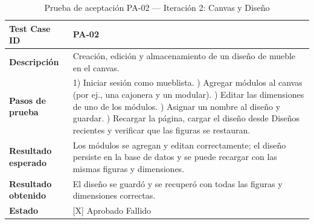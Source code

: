 ﻿\documentclass{iccmemoria}
\begin{document}
\begin{table}[H]
\centering
\caption{Prueba de aceptación PA-02 — Iteración 2: Canvas y Diseño}
\label{tab:pa02}
\begin{tabular}{|p{4cm}|p{9.5cm}|}
\hline
\textbf{Test Case ID} & PA-02 \\
\hline
\textbf{Descripción} & Creación, edición y almacenamiento de un diseño de mueble en el canvas. \\
\hline
\textbf{Pasos de prueba} &
1) Iniciar sesión como mueblista. \newline
2) Agregar módulos al canvas (por ej., una cajonera y un modular). \newline
3) Editar las dimensiones de uno de los módulos. \newline
4) Asignar un nombre al diseño y guardar. \newline
5) Recargar la página, cargar el diseño desde Diseños recientes y verificar que las figuras se restauran. \\
\hline
\textbf{Resultado esperado} & Los módulos se agregan y editan correctamente; el diseño persiste en la base de datos y se puede recargar con las mismas figuras y dimensiones. \\
\hline
\textbf{Resultado obtenido} & El diseño se guardó y se recuperó con todas las figuras y dimensiones correctas. \\
\hline
\textbf{Estado} & {[X]} Aprobado \quad {[ ]} Fallido \\
\hline
\end{tabular}
\end{table}
\end{document}
